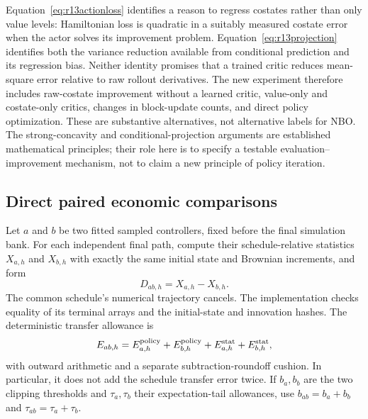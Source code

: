 Equation~\eqref{eq:r13actionloss} identifies a reason to regress costates rather than only value levels: Hamiltonian loss is quadratic in a suitably measured costate error when the actor solves its improvement problem. Equation~\eqref{eq:r13projection} identifies both the variance reduction available from conditional prediction and its regression bias. Neither identity promises that a trained critic reduces mean-square error relative to raw rollout derivatives. The new experiment therefore includes raw-costate improvement without a learned critic, value-only and costate-only critics, changes in block-update counts, and direct policy optimization. These are substantive alternatives, not alternative labels for NBO. The strong-concavity and conditional-projection arguments are established mathematical principles; their role here is to specify a testable evaluation--improvement mechanism, not to claim a new principle of policy iteration.

\subsection{Direct paired economic comparisons}
Let $a$ and $b$ be two fitted sampled controllers, fixed before the final simulation bank. For each independent final path, compute their schedule-relative statistics $X_{a,h}$ and $X_{b,h}$ with exactly the same initial state and Brownian increments, and form
\[
 D_{ab,h}=X_{a,h}-X_{b,h}.
\]
The common schedule's numerical trajectory cancels. The implementation checks equality of its terminal arrays and the initial-state and innovation hashes. The deterministic transfer allowance is
\[
 E_{ab,h}=E_{a,h}^{\rm policy}+E_{b,h}^{\rm policy}
              +E_{a,h}^{\rm stat}+E_{b,h}^{\rm stat},
\]
with outward arithmetic and a separate subtraction-roundoff cushion. In particular, it does not add the schedule transfer error twice. If $b_a,b_b$ are the two clipping thresholds and $\tau_a,\tau_b$ their expectation-tail allowances, use $b_{ab}=b_a+b_b$ and $\tau_{ab}=\tau_a+\tau_b$.

